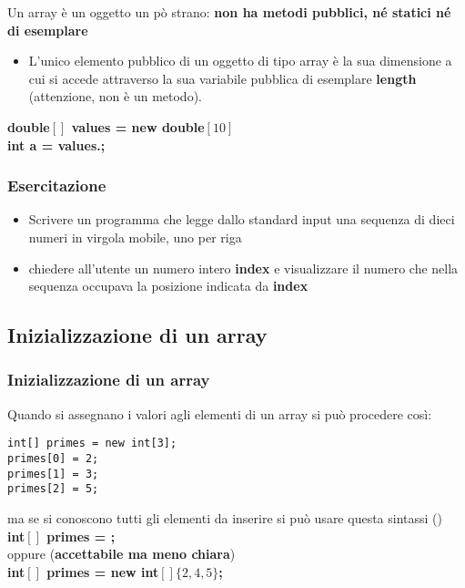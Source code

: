 \begin{frame}
\begin{block}{}
Un array è un oggetto un pò strano: \textbf{non ha metodi pubblici, né statici né di esemplare}
\begin{itemize}
\item L'unico elemento pubblico di un oggetto di tipo array è la sua dimensione a cui si accede attraverso la sua variabile pubblica
di esemplare \textbf{\alert{length}} (attenzione, non è un metodo).
\end{itemize}
\end{block}
\hspace{0.7cm}\textbf{double$\left[\right]$ values = new double$[10]$}\\
\hspace{0.7cm}\textbf{int \alert{a} = values.;}
\end{frame}

\begin{frame}
\frametitle{Esercitazione}
\begin{block}{}
\begin{itemize}
\item Scrivere un programma che legge dallo standard input una sequenza di dieci numeri in virgola mobile, uno per riga
\item chiedere all'utente un numero intero \textbf{index} e visualizzare il numero che nella sequenza occupava 
la posizione indicata da \textbf{index}
\end{itemize}
\end{block}
\end{frame}
\subsection*{Inizializzazione di un array}

\begin{frame}[fragile]
\frametitle{Inizializzazione di un array}
\begin{block}{}
Quando si assegnano i valori agli elementi di un array si può procedere così:
\end{block}
\begin{lstlisting}
int[] primes = new int[3];
primes[0] = 2;
primes[1] = 3;
primes[2] = 5;
\end{lstlisting}
ma se si conoscono tutti gli elementi da inserire si può usare questa sintassi (\textbf{})\\
\hspace{0.9cm} \textbf{int$[]$ primes = ;}\\
oppure (\textbf{\alert{accettabile ma meno chiara}})\\
\hspace{0.9cm} \textbf{int$[]$ primes = \alert{new int$[]\{2,4,5\}$};}
\end{frame}

